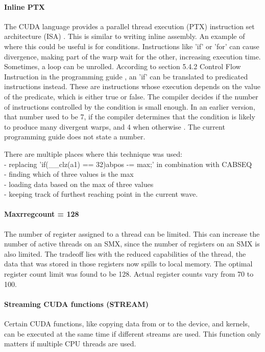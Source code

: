 \documentclass[../thesis.tex]{subfiles}
\begin{document}
\paragraph{Inline PTX}
The CUDA language provides a parallel thread execution (PTX) instruction set architecture (ISA) \cite{PTX1}\cite{PTX2}.
This is similar to writing inline assembly.
An example of where this could be useful is for conditions.
Instructions like 'if' or 'for' can cause divergence, making part of the warp wait for the other, increasing execution time.
Sometimes, a loop can be unrolled.
According to section 5.4.2 Control Flow Instruction in the programming guide \cite{cuda}, an 'if' can be translated to predicated instructions instead.
These are instructions whose execution depends on the value of the predicate, which is either true or false.
The compiler decides if the number of instructions controlled by the condition is small enough.
In an earlier version, that number used to be 7, if the compiler determines that the condition is likely to produce many divergent warps, and 4 when otherwise \cite{PTX3}.
The current programming guide does not state a number.

There are multiple places where this technique was used: \\
- replacing 'if(\_\_clz(a1) == 32){abpos -= max;}' in combination with CABSEQ \\
- finding which of three values is the max \\
- loading data based on the max of three values \\
- keeping track of furthest reaching point in the current wave.

\paragraph{Maxrregcount = 128}
The number of register assigned to a thread can be limited.
This can increase the number of active threads on an SMX, since the number of registers on an SMX is also limited.
The tradeoff lies with the reduced capabilities of the thread, the data that was stored in those registers now spills to local memory.
The optimal register count limit was found to be 128.
Actual register counts vary from 70 to 100.

\paragraph{Streaming CUDA functions (STREAM)}
Certain CUDA functions, like copying data from or to the device, and kernels, can be executed at the same time if different streams are used.
This function only matters if multiple CPU threads are used.
\end{document}

